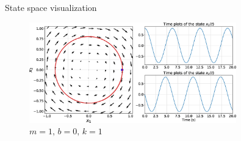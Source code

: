 \documentclass[aspectratio=169]{beamer}
\begin{document}
\begin{frame}[t]{State space visualization}
\begin{figure}
    \includegraphics[width=0.8\textwidth]{img/undamped.eps}
    \captionsetup{labelformat=empty}
    \caption{\small $m=1, \, b=0, \, k=1$}
\end{figure}

\end{frame}
\end{document}
